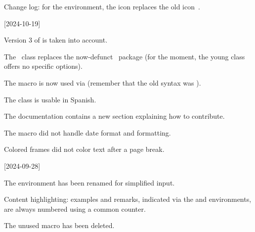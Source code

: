 \begin{tdocupdate}
    \item Change log: for the  environment, the icon  replaces the old icon \fbox{\faMagic}\,.
\end{tdocupdate}

\tdocsep




[2024-10-19]

\small

\begin{tdoctech}
    \item Version 3 of  is taken into account.
\end{tdoctech}


\begin{tdocbreak}
    \item The \thisproj\ class replaces the now-defunct \thisproj\ package (for the moment, the young class offers no specific options).

    \item The  macro is now used via  (remember that the old syntax was ).
\end{tdocbreak}


\begin{tdocnew}
    \item The class is usable in Spanish.

    \item The documentation contains a new section explaining how to contribute.
\end{tdocnew}


\begin{tdocfix}
    \item The  macro did not handle date format and formatting.

    \item Colored frames did not color text after a page break.
\end{tdocfix}

\tdocsep




[2024-09-28]

\small

\begin{tdocbreak}
    \item The  environment has been renamed  for simplified input.

    \item Content highlighting: examples and remarks, indicated via the  and  environments, are always numbered using a common counter.

    \item The unused macro  has been deleted.
\end{tdocbreak}


